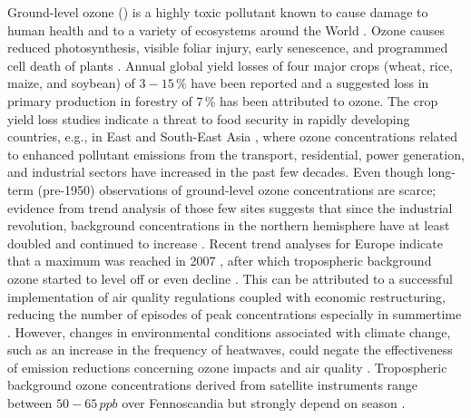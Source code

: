 \documentclass[bg, manuscript]{copernicus}
\begin{document}
Ground-level ozone () is a highly toxic pollutant known to cause damage to human health \citep{WHO2008} and to a variety of ecosystems around the World \citep{PT:Emberson2020}. Ozone causes reduced photosynthesis, visible foliar injury, early senescence, and programmed cell death of plants \citep{PCE:Kangasjarvi2005}. Annual global yield losses of four major crops (wheat, rice, maize, and soybean) of $3-15\,\unit{\%}$ have been reported \citep{PJ:Ainsworth2017} and a suggested loss in primary production in forestry of $7\,\unit{\%}$ \citep{GCB:Wittig2009,EP:Matyssek2012} has been attributed to ozone.
The crop yield loss studies indicate a threat to food security in rapidly developing countries, e.g., in East and South-East Asia \citep{GCB:Tang2013,NCC:Tai2014,AE:Chuwah2015,GCB:Mills2018}, where ozone concentrations related to enhanced pollutant emissions from the transport, residential, power generation, and industrial sectors have increased in the past few decades. Even though long-term (pre-1950) observations of ground-level ozone concentrations are scarce; evidence from trend analysis of those few sites suggests that since the industrial revolution, background concentrations in the northern hemisphere have at least doubled and continued to increase \citep{IPCC2013}. Recent trend analyses for Europe indicate that a maximum was reached in 2007 \citep{AE:Derwent2018}, after which tropospheric background ozone started to level off or even decline \citep{ESA:Cooper2014, ACP:Wespes2018,ESA:Gaudel2018}. This can be attributed to a successful implementation of air quality regulations coupled with economic restructuring, reducing the number of episodes of peak concentrations especially in summertime \citep[e.g.,][]{ESA:Fleming2018, ESA:Mills2018}. However, changes in environmental conditions associated with climate change, such as an increase in the frequency of heatwaves, could negate the effectiveness of emission reductions concerning ozone impacts and air quality \citep{NCC:Lin2020}. Tropospheric background ozone concentrations derived from satellite instruments range between $50-65\,\unit{ppb}$ over Fennoscandia but strongly depend on season \citep{ESA:Cooper2014}.
\end{document}
